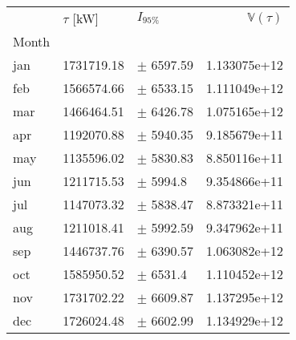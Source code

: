 \begin{tabular}{lllr}
\toprule
{} & $\tau$ [kW] &      $I_{95\%}$ &  $\mathbb{V}(\tau)$ \\
Month &             &                 &                     \\
\midrule
jan   &  1731719.18 &   $\pm$ 6597.59 &        1.133075e+12 \\
feb   &  1566574.66 &   $\pm$ 6533.15 &        1.111049e+12 \\
mar   &  1466464.51 &   $\pm$ 6426.78 &        1.075165e+12 \\
apr   &  1192070.88 &   $\pm$ 5940.35 &        9.185679e+11 \\
may   &  1135596.02 &   $\pm$ 5830.83 &        8.850116e+11 \\
jun   &  1211715.53 &    $\pm$ 5994.8 &        9.354866e+11 \\
jul   &  1147073.32 &   $\pm$ 5838.47 &        8.873321e+11 \\
aug   &  1211018.41 &   $\pm$ 5992.59 &        9.347962e+11 \\
sep   &  1446737.76 &   $\pm$ 6390.57 &        1.063082e+12 \\
oct   &  1585950.52 &    $\pm$ 6531.4 &        1.110452e+12 \\
nov   &  1731702.22 &   $\pm$ 6609.87 &        1.137295e+12 \\
dec   &  1726024.48 &   $\pm$ 6602.99 &        1.134929e+12 \\
\bottomrule
\end{tabular}
